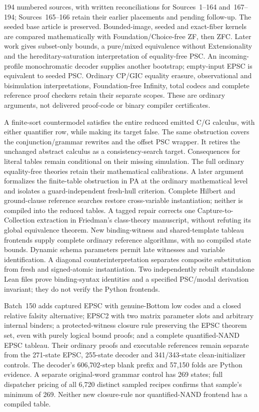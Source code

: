 \documentclass[11pt]{article}
\begin{document}
{194 numbered sources, with written reconciliations for Sources~1--164 and~167--194;
Sources~165--166 retain their earlier placements and pending follow-up.
The seeded base article is preserved.
Bounded-image, seeded and exact-fiber kernels are compared mathematically with
Foundation/Choice-free ZF, then ZFC. Later work gives subset-only bounds,
a pure/mixed equivalence without Extensionality and the hereditary-saturation
interpretation of equality-free PSC. An incoming-profile monochromatic decoder
supplies another bootstrap; empty-input EPSC is equivalent to seeded PSC.
Ordinary CP/GIC equality erasure, observational and bisimulation interpretations,
Foundation-free Infinity, total codecs and complete reference proof checkers
retain their separate scopes. These are ordinary arguments, not delivered
proof-code or binary compiler certificates.

A finite-sort countermodel satisfies the entire reduced emitted C/G calculus,
with either quantifier row, while making its target false. The same obstruction
covers the conjunction/grammar rewrites and the offset PSC wrapper. It retires
the unchanged abstract calculus as a consistency-search target. Consequences
for literal tables remain conditional on their missing simulation. The full
ordinary equality-free theories retain their mathematical calibrations.
A later argument formalizes the finite-table obstruction in PA at the
ordinary mathematical level and isolates a guard-independent fresh-hull
criterion. Complete Hilbert and ground-clause reference searches restore
cross-variable instantiation; neither is compiled into the reduced tables.
A tagged repair corrects one Capture-to-Collection extraction in Friedman's
class-theory manuscript, without refuting its global equivalence theorem.
New binding-witness and shared-template tableau frontends supply complete
ordinary reference algorithms, with no compiled state bounds. Dynamic schema
parameters permit late witnesses and variable identification. A diagonal
counterinterpretation separates composite substitution from fresh and
signed-atomic instantiation. Two independently rebuilt standalone Lean files
prove binding-syntax identities and a specified PSC/modal derivation invariant;
they do not verify the Python frontends.

Batch~150 adds captured EPSC with genuine-Bottom low codes and a closed relative
falsity alternative; EPSC2 with two matrix parameter slots and arbitrary internal
binders; a protected-witness closure rule preserving the EPSC theorem set, even
with purely logical bound proofs; and a complete quantified-NAND EPSC tableau.
Their ordinary proofs and executable references remain separate from the
271-state EPSC, 255-state decoder and 341/343-state clean-initializer controls.
The decoder's 606,702-step blank prefix and 57,150 folds are Python evidence.
A separate original-word grammar control has 269 states; full dispatcher pricing
of all 6,720 distinct sampled recipes confirms that sample's minimum of 269.
Neither new closure-rule nor quantified-NAND frontend has a compiled table.

}
\end{document}
